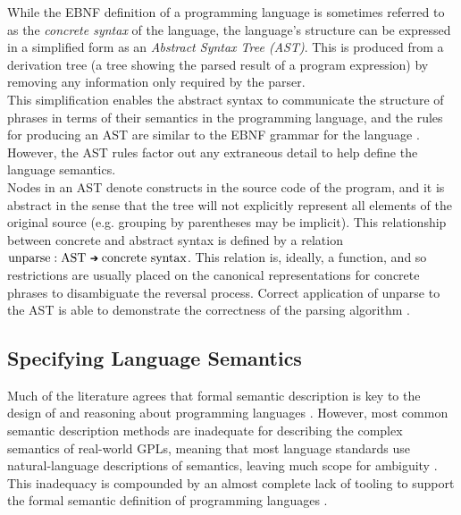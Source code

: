 While the EBNF definition of a programming language is sometimes referred to as the \textit{concrete syntax} of the language, the language's structure can be expressed in a simplified form as an \textit{Abstract Syntax Tree (AST)}.
This is produced from a derivation tree (a tree showing the parsed result of a program expression) by removing any information only required by the parser.\\

This simplification enables the abstract syntax to communicate the structure of phrases in terms of their semantics in the programming language, and the rules for producing an AST are similar to the EBNF grammar for the language \citep{slonneger1995formal}.
However, the AST rules factor out any extraneous detail to help define the language semantics. \\

Nodes in an AST denote constructs in the source code of the program, and it is abstract in the sense that the tree will not explicitly represent all elements of the original source (e.g. grouping by parentheses may be implicit). 
This relationship between concrete and abstract syntax is defined by a relation $\text{unparse} : \text{AST} \mathgoesto \text{concrete syntax}$.
This relation is, ideally, a function, and so restrictions are usually placed on the canonical representations for concrete phrases to disambiguate the reversal process. 
Correct application of unparse to the AST is able to demonstrate the correctness of the parsing algorithm \citep[pg. 29]{slonneger1995formal}.



\subsection{Specifying Language Semantics} %
\label{sub:specifying_language_semantics}

Much of the literature agrees that formal semantic description is key to the design of and reasoning about programming languages \citep{Zhang:2004:SSD:981009.981013,mosses1986use,Binsbergen:2016:TSC:2892664.2893464}.
However, most common semantic description methods are inadequate for describing the complex semantics of real-world GPLs, meaning that most language standards use natural-language descriptions of semantics, leaving much scope for ambiguity \citep{mosses1986use}.
This inadequacy is compounded by an almost complete lack of tooling to support the formal semantic definition of programming languages \citep{Binsbergen:2016:TSC:2892664.2893464}.\\

